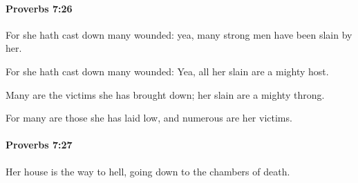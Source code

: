 		\paragraph{Proverbs 7:26} %
			\label{PROVERBS-7-26}

			For she hath cast down many wounded: yea, many strong men have been slain by her.

			\begin{versebox}
					\item[BHS] 
					\item[ASV] For she hath cast down many wounded: Yea, all her slain are a mighty host.
					\item[NIV] Many are the victims she has brought down; her slain are a mighty throng.
					\item[NRSV] For many are those she has laid low, and numerous are her victims.
			\end{versebox}

		\paragraph{Proverbs 7:27} %
			\label{PROVERBS-7-27}

			Her house is the way to hell, going down to the chambers of death.

